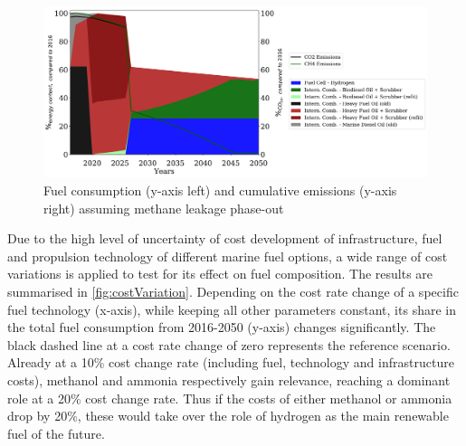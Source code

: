 \documentclass[article]{elsarticle}
\begin{document}
\begin{figure}[htb]
    \centering
    \includegraphics[width=\textwidth]{figures/RS_MP_fuels_emissions.pdf}
    \caption{Fuel consumption (y-axis left) and cumulative emissions (y-axis right) assuming methane leakage phase-out}
    \label{fig:RS_MP}
\end{figure}



Due to the high level of uncertainty of cost development of infrastructure, fuel and propulsion technology of different marine fuel options, a wide range of cost variations is applied to test for its effect on fuel composition. The results are summarised in \autoref{fig:costVariation}. Depending on the cost rate change of a specific fuel technology (x-axis), while keeping all other parameters constant, its share in the total fuel consumption from 2016-2050 (y-axis) changes significantly. The black dashed line at a cost rate change of zero represents the reference scenario. Already at a 10\% cost change rate (including fuel, technology and infrastructure costs), methanol and ammonia respectively gain relevance, reaching a dominant role at a 20\% cost change rate. Thus if the costs of either methanol or ammonia drop by 20\%, these would take over the role of hydrogen as the main renewable fuel of the future.
\end{document}
